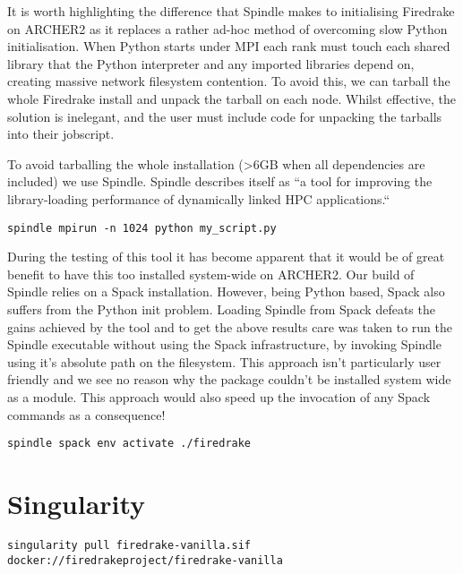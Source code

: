 \documentclass[a4paper,11pt]{article}
\begin{document}
It is worth highlighting the difference that Spindle makes to initialising Firedrake on ARCHER2 as it replaces a rather ad-hoc method of overcoming slow Python initialisation.
When Python starts under MPI each rank must touch each shared library that the Python interpreter and any imported libraries depend on, creating massive network filesystem contention.
To avoid this, we can tarball the whole Firedrake install and unpack the tarball on each node.
Whilst effective, the solution is inelegant, and the user must include code for unpacking the tarballs into their jobscript.

To avoid tarballing the whole installation (>6GB when all dependencies are included) we use Spindle.
Spindle describes itself as ``a tool for improving the library-loading performance of dynamically linked HPC applications.``


\begin{lstlisting}
spindle mpirun -n 1024 python my_script.py
\end{lstlisting}

During the testing of this tool it has become apparent that it would be of great benefit to have this too installed system-wide on ARCHER2.
Our build of Spindle relies on a Spack installation.
However, being Python based, Spack also suffers from the Python init problem.
Loading Spindle from Spack defeats the gains achieved by the tool and to get the above results care was taken to run the Spindle executable without using the Spack infrastructure, by invoking Spindle using it's absolute path on the filesystem.
This approach isn't particularly user friendly and we see no reason why the package couldn't be installed system wide as a module.
This approach would also speed up the invocation of any Spack commands as a consequence!

\begin{lstlisting}
spindle spack env activate ./firedrake
\end{lstlisting}


\clearpage
\section{Singularity}
\label{sec:singularity}
\begin{lstlisting}
singularity pull firedrake-vanilla.sif docker://firedrakeproject/firedrake-vanilla
\end{lstlisting}
\end{document}
